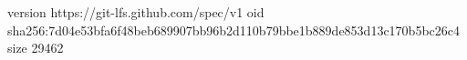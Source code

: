 version https://git-lfs.github.com/spec/v1
oid sha256:7d04e53bfa6f48beb689907bb96b2d110b79bbe1b889de853d13c170b5bc26c4
size 29462
